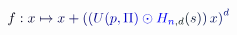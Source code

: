 \documentclass[12pt]{article}
\begin{document}
\makeatletter
\renewcommand*{\@textcolor}[3]{%
  \protect\leavevmode
  \begingroup
    \color#1{#2}#3%
  \endgroup
}
\makeatother
\begin{displaymath}
\mathcolor[RGB]{0,0,15}{f} \mathcolor[RGB]{0,0,30}{:} \mathcolor[RGB]{0,0,45}{x} \mathcolor[RGB]{0,0,60}{\mapsto} \mathcolor[RGB]{0,0,75}{x} \mathcolor[RGB]{0,0,90}{+} \mathcolor[RGB]{0,0,105}{\left(} \mathcolor[RGB]{0,0,120}{(} \mathcolor[RGB]{0,0,135}{U} \mathcolor[RGB]{0,0,150}{(} \mathcolor[RGB]{0,0,165}{p} \mathcolor[RGB]{0,0,180}{,} \mathcolor[RGB]{0,0,195}{\Pi} \mathcolor[RGB]{0,0,210}{)} \mathcolor[RGB]{0,0,225}{\odot} \mathcolor[RGB]{0,0,240}{H} _ { \mathcolor[RGB]{0,0,255}{n} \mathcolor[RGB]{0,15,0}{,} \mathcolor[RGB]{0,15,15}{d} } \mathcolor[RGB]{0,15,30}{(} \mathcolor[RGB]{0,15,45}{s} \mathcolor[RGB]{0,15,60}{)} \mathcolor[RGB]{0,15,75}{)} \, \mathcolor[RGB]{0,15,90}{x} \mathcolor[RGB]{0,15,105}{\right)} ^ { \mathcolor[RGB]{0,15,120}{d} }
\end{displaymath}
\end{document}
